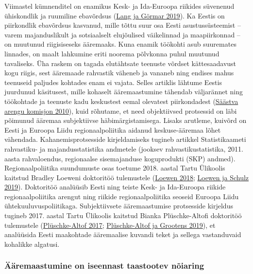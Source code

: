 \documentclass[estonian,]{article}
\begin{document}
Viimastel kümnenditel on enamikus Kesk- ja Ida-Euroopa riikides süvenenud ühiskondlik ja ruumiline ebavõrdsus (\protect\hyperlink{Lang2019}{Lang ja Görmar 2019}). Ka Eestis on piirkondlik ebavõrdsus kasvanud, mille tõttu suur osa Eesti asustussüsteemist -- varem majanduslikult ja sotsiaalselt elujõulised väikelinnad ja maapiirkonnad -- on muutunud riigisiseseks ääremaaks. Kuna enamik töökohti asub suuremates linnades, on maalt lahkumine eriti noorema põlvkonna puhul muutunud tavaliseks. Üha raskem on tagada elutähtsate teenuste võrdset kättesaadavust kogu riigis, sest ääremaade rahvastik väheneb ja vananeb ning endises mahus teenuseid paljudes kohtades enam ei vajata. Selles artiklis lähtume Eestis juurdunud käsitusest, mille kohaselt ääremaastumine tähendab väljarännet ning töökohtade ja teenuste kadu keskustest eemal olevatest piirkondadest (\protect\hyperlink{Suxe4uxe4stva-arengu-komisjon2010}{Säästva arengu komisjon 2010}), kuid rõhutame, et need objektiivsed protsessid on läbi põimunud ääremaa subjektiivse häbimärgistamisega. Lisaks arutleme, kuivõrd on Eesti ja Euroopa Liidu regionaalpoliitika aidanud keskuse-ääremaa lõhet vähendada. Kahanemisprotsesside kirjeldamiseks tugineb artikkel Statistikaameti rahvastiku- ja majandusstatistika andmetele (jooksev rahvastikustatistika, 2011. aasta rahvaloendus, regionaalse sisemajanduse koguprodukti (SKP) andmed). Regionaalpoliitika suundumuste osas toetume 2018. aastal Tartu Ülikoolis kaitstud Bradley Loeweni doktoritöö tulemustele (\protect\hyperlink{Loewen2018}{Loewen 2018}; \protect\hyperlink{Loewen2019}{Loewen ja Schulz 2019}). Doktoritöö analüüsib Eesti ning teiste Kesk- ja Ida-Euroopa riikide regionaalpoliitika arengut ning riikide regionaalpoliitika seoseid Euroopa Liidu ühtekuuluvuspoliitikaga. Subjektiivsete ääremaastumise protsesside kirjeldus tugineb 2017. aastal Tartu Ülikoolis kaitstud Bianka Plüschke-Altofi doktoritöö tulemustele (\protect\hyperlink{Pluxfcschke-Altof2017}{Plüschke-Altof 2017}; \protect\hyperlink{Pluxfcschke-Altof2019}{Plüschke-Altof ja Grootens 2019}), et analüüsida Eesti maakohtade ääremaalise kuvandi teket ja sellega vastanduvaid kohalikke algatusi.

\hypertarget{uxe4uxe4remaastumine-on-iseennast-taastootev-nuxf5iaring}{%
\subsubsection*{Ääremaastumine on iseennast taastootev nõiaring}\label{uxe4uxe4remaastumine-on-iseennast-taastootev-nuxf5iaring}}
\end{document}

